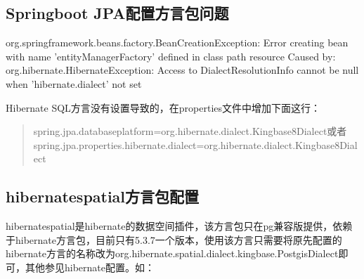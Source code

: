 \documentclass[letterpaper,10pt,english]{sphinxmanual}
\begin{document}
\begin{sphinxVerbatim}[commandchars=\\\{\}]
     
   
   
\end{sphinxVerbatim}


\subsection{Springboot JPA配置方言包问题}
\label{\detokenize{interface/hibernate:springboot-jpa}}
org.springframework.beans.factory.BeanCreationException: Error creating bean with name 'entityManagerFactory' defined in class path resource
Caused by: org.hibernate.HibernateException: Access to DialectResolutionInfo cannot be null when 'hibernate.dialect' not set

Hibernate SQL方言没有设置导致的，在properties文件中增加下面这行：
\begin{quote}

spring.jpa.database\sphinxhyphen{}platform=org.hibernate.dialect.Kingbase8Dialect或者spring.jpa.properties.hibernate.dialect=org.hibernate.dialect.Kingbase8Dialect
\end{quote}


\subsection{hibernate\sphinxhyphen{}spatial方言包配置}
\label{\detokenize{interface/hibernate:hibernate-spatial}}
hibernate\sphinxhyphen{}spatial是hibernate的数据空间插件，该方言包只在pg兼容版提供，依赖于hibernate方言包，目前只有5.3.7一个版本，使用该方言只需要将原先配置的hibernate方言的名称改为org.hibernate.spatial.dialect.kingbase.PostgisDialect即可，其他参见hibernate配置。如：
\end{document}
